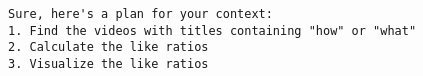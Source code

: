 \begin{tcolorbox}[colback=blue!5!white, colframe=blue!75!black, title=Generated by StarCoder2-15B in one task:, text width=\textwidth]
\begin{verbatim}
Sure, here's a plan for your context:
1. Find the videos with titles containing "how" or "what"
2. Calculate the like ratios
3. Visualize the like ratios
\end{verbatim}
\end{tcolorbox}
\twocolumn